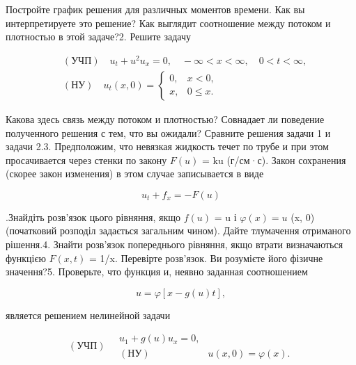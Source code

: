\documentclass[
  ukrainian,
]{article}
\begin{document}
Постройте график решения для различных моментов времени. Как вы
интерпретируете это решение? Как выглядит соотношение между потоком и
плотностью в этой задаче?2. Решите задачу

\[
\begin{split} & (\text{УЧП}) \quad u_t + u^2 u_x = 0, \quad -\infty < x < \infty, \quad 0 < t < \infty, \\ & (\text{НУ}) \quad u_t(x, 0) = \begin{cases} 0, & x < 0, \\ x, & 0 \leqslant x. \end{cases} \end{split}
\]

Какова здесь связь между потоком и плотностью? Совнадает ли поведение
полученного решения с тем, что вы ожидали? Сравните решения задачи 1 и
задачи 2.3. Предположим, что невязкая жидкость течет по трубе и при этом
просачивается через стенки по закону \(F(u)\) = ku (г/см·с). Закон
сохранения (скорее закон изменения) в этом случае записывается в виде

\[
u_t + f_x = -F(u)
\]

.Знайдіть розв'язок цього рівняння, якщо \(f(u)\) = u і
\(\varphi(x) = u\) (x, 0) (початковий розподіл задається загальним
чином). Дайте тлумачення отриманого рішення.4. Знайти розв'язок
попереднього рівняння, якщо втрати визначаються функцією \(F(x, t)\) =
1/x. Перевірте розв'язок. Ви розумієте його фізичне значення?5.
Проверьте, что функция и, неявно заданная соотношением

\[
u = \varphi[x - g(u) t],
\]

является решением нелинейной задачи

\[
(\text{УЧП}) \quad \begin{array}{ll} u_1 + g(u) u_x = 0, \\ (\text{НУ}) & u(x, 0) = \varphi(x). \end{array}
\]
\end{document}
